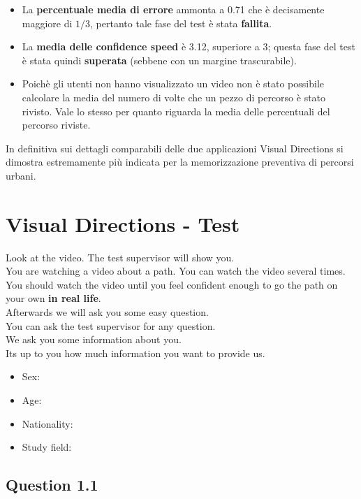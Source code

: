 \documentclass[12pt,a4paper,openright, notitlepage]{report}
\begin{document}
\begin{itemize}
	\item La \textbf{percentuale media di errore} ammonta a 0.71 che è decisamente maggiore di $1/3$, pertanto tale fase del test è stata \textbf{fallita}.
	\item La \textbf{media delle confidence speed} è 3.12, superiore a 3; questa fase del test è stata quindi \textbf{superata} (sebbene con un margine trascurabile).
	\item Poichè gli utenti non hanno visualizzato un video non è stato possibile calcolare la media del numero di volte che un pezzo di percorso è stato rivisto. Vale lo stesso per quanto riguarda la media delle percentuali del percorso riviste.
\end{itemize}

In definitiva sui dettagli comparabili delle due applicazioni Visual Directions si dimostra estremamente più indicata per la memorizzazione preventiva di percorsi urbani.


\newpage
\section{Visual Directions - Test}

Look at the video. The test supervisor will show you. \\
You are watching a video about a path. You can watch the video several times. \\
You should watch the video until you feel confident enough to go the path on your own \textbf{in real life}.  \\
Afterwards we will ask you some easy question. \\
You can ask the test supervisor for any question. \\

We ask you some information about you. \\
Its up to you how much information you want to provide us. \\

\begin{itemize}
	\item Sex: 
	\item Age: 
	\item Nationality:
	\item Study field:
\end{itemize}

\subsection{Question 1.1}
\end{document}
